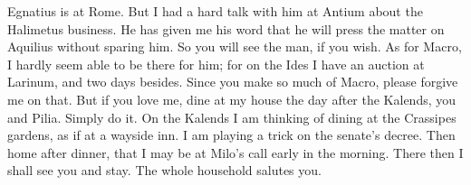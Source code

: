 

 Egnatius is at Rome. But I had a hard talk with him at Antium about the Halimetus business. He has given me his word that he will press the matter on Aquilius without sparing him. So you will see the man, if you wish. As for Macro, I hardly seem able to be there for him; for on the Ides I have an auction at Larinum, and two days besides. Since you make so much of Macro, please forgive me on that. But if you love me, dine at my house the day after the Kalends, you and Pilia. Simply do it. On the Kalends I am thinking of dining at the Crassipes gardens, as if at a wayside inn. I am playing a trick on the senate's decree. Then home after dinner, that I may be at Milo's call early in the morning. There then I shall see you and stay. The whole household salutes you.
